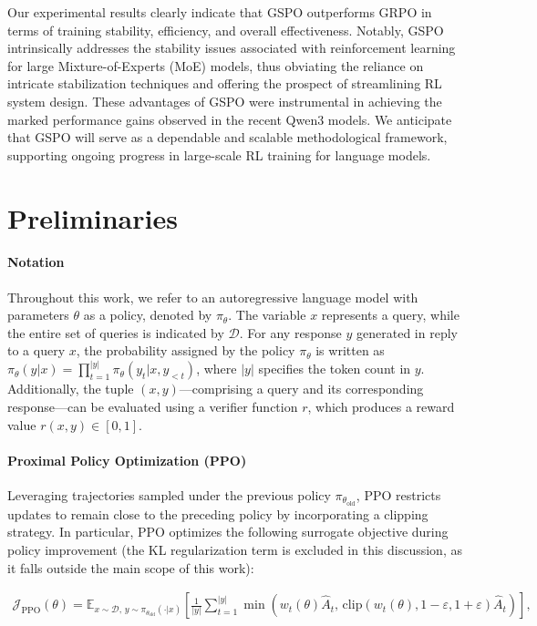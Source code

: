 Our experimental results clearly indicate that GSPO outperforms GRPO in terms of training stability, efficiency, and overall effectiveness. Notably, GSPO intrinsically addresses the stability issues associated with reinforcement learning for large Mixture-of-Experts (MoE) models, thus obviating the reliance on intricate stabilization techniques and offering the prospect of streamlining RL system design. These advantages of GSPO were instrumental in achieving the marked performance gains observed in the recent Qwen3 models. We anticipate that GSPO will serve as a dependable and scalable methodological framework, supporting ongoing progress in large-scale RL training for language models.

\section{Preliminaries}

\paragraph{Notation}
Throughout this work, we refer to an autoregressive language model with parameters $\theta$ as a policy, denoted by $\pi_\theta$. The variable $x$ represents a query, while the entire set of queries is indicated by $\mathcal{D}$. For any response $y$ generated in reply to a query $x$, the probability assigned by the policy $\pi_\theta$ is written as $\pi_\theta (y | x)=\prod_{t=1}^{|y|} \pi_\theta (y_t | x, y_{<t} )$, where $|y|$ specifies the token count in $y$. Additionally, the tuple $(x, y)$—comprising a query and its corresponding response—can be evaluated using a verifier function $r$, which produces a reward value $r(x, y) \in [0, 1]$.

\paragraph{Proximal Policy Optimization (PPO)} Leveraging trajectories sampled under the previous policy $\pi_{\theta_\text{old}}$, PPO \citep{ppo} restricts updates to remain close to the preceding policy by incorporating a clipping strategy. In particular, PPO optimizes the following surrogate objective during policy improvement (the KL regularization term is excluded in this discussion, as it falls outside the main scope of this work):

\begin{align}
\mathcal{J}_\text{PPO}(\theta) = \mathbb{E}_{ x \sim \mathcal{D},\, y \sim \pi_{\theta_\text{old}}( \cdot | x) }
\left[ \frac{1}{|y|} \sum_{t=1}^{|y|} 
\min \left( w_{t}(\theta) \widehat{A}_{t},  \, \mathrm{clip} \left( w_{t}(\theta), 1 - {\varepsilon}, 1 + {\varepsilon}\right) \widehat{A}_{t} \right)
\right],
\end{align}

